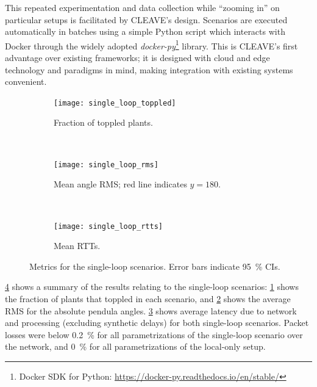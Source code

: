 This repeated experimentation and data collection while ``zooming in'' on particular setups is facilitated by \ac{CLEAVE}'s design.
Scenarios are executed automatically in batches using a simple Python script which interacts with Docker through the widely adopted \emph{docker-py}\footnote{Docker SDK for Python: \url{https://docker-py.readthedocs.io/en/stable/}} library.
This is \ac{CLEAVE}'s first advantage over existing frameworks; it is designed with cloud and edge technology and paradigms in mind, making integration with existing systems convenient.

\begin{figure}[t]
    \centering
    \begin{subfigure}[t]{\columnwidth}
        \centering
        \texttt{[image: single\_loop\_toppled]}
        \caption{Fraction of toppled plants.}\label{fig:single:topple}
    \end{subfigure}\\
    \begin{subfigure}[t]{\columnwidth}
        \centering
        \texttt{[image: single\_loop\_rms]}
        \caption{Mean angle \acs*{RMS}; red line indicates \( y = 180 \).}\label{fig:single:rms}
    \end{subfigure}\\
    \begin{subfigure}[t]{\columnwidth}
        \centering
        \texttt{[image: single\_loop\_rtts]}
        \caption{
            Mean \acsp*{RTT}.
        }\label{fig:single:rtt}
    \end{subfigure}%
    \caption[caption]{
        Metrics for the single-loop scenarios.
        Error bars indicate \SI{95}{\percent} \acp{CI}.
        }%
    \label{fig:single}
\end{figure}

\cref{fig:single} shows a summary of the results relating to the single-loop scenarios:
\cref{fig:single:topple} shows the fraction of plants that toppled in each scenario, and \cref{fig:single:rms} shows the average \ac{RMS} for the absolute pendula angles.
\cref{fig:single:rtt} shows average latency due to network and processing (excluding synthetic delays) for both single-loop scenarios.
Packet losses were below \SI{0.2}{\percent} for all parametrizations of the single-loop scenario over the network, and \SI{0}{\percent} for all parametrizations of the local-only setup.

